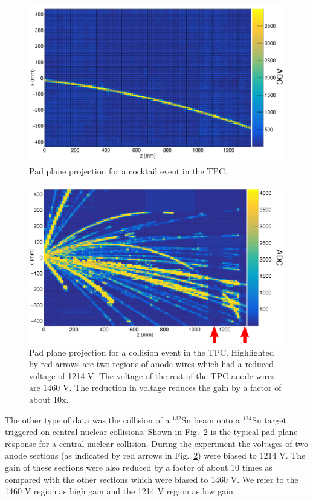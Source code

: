 \documentclass[review]{elsarticle}
\begin{document}
\begin{figure}[ht!]
\includegraphics[width=\linewidth]{cocktail.png}
\caption{Pad plane projection for a cocktail event in the TPC.}
\label{fig:cocktail}
\end{figure}

\begin{figure}[ht!]
\includegraphics[width=\linewidth]{data.png}
\caption{Pad plane projection for a collision event in the TPC. Highlighted by red arrows are two regions of anode wires which had a reduced voltage of 1214 V. The voltage of the rest of the TPC anode wires are 1460 V. The reduction in voltage reduces the gain by a factor of about 10x. }
\label{fig:data}
\end{figure}



The other type of data was the collision of a ${}^{132}$Sn beam onto a ${}^{124}$Sn target triggered on central nuclear collisions. Shown in Fig.~\ref{fig:data} is the typical pad plane response for a central nuclear collision. During the experiment the voltages of two anode sections (as indicated by red arrows in Fig.~\ref{fig:data}) were biased to 1214 V. The gain of these sections were also reduced by a factor of about 10 times as compared with the other sections which were biased to 1460 V. We refer to the 1460 V region as high gain and the 1214 V region as low gain. 
\end{document}
